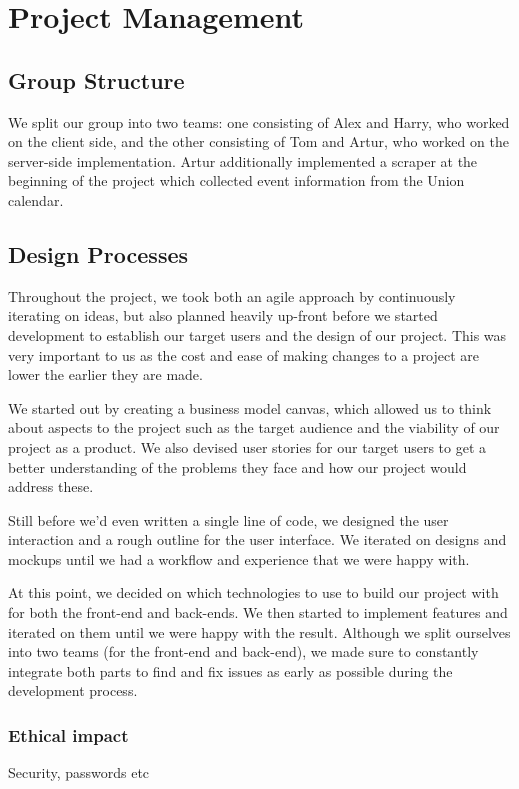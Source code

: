 \documentclass[11pt]{article}
\begin{document}
\section {Project Management}

\subsection {Group Structure}

We split our group into two teams: one consisting of Alex and Harry, who worked on the client side, and the other consisting of Tom and Artur, who worked on the server-side implementation. Artur additionally implemented a scraper at the beginning of the project which collected event information from the Union calendar.

\subsection {Design Processes}

Throughout the project, we took both an agile approach by continuously iterating on ideas, but also planned heavily up-front before we started development to establish our target users and the design of our project. This was very important to us as the cost and ease of making changes to a project are lower the earlier they are made.

We started out by creating a business model canvas, which allowed us to think about aspects to the project such as the target audience and the viability of our project as a product. We also devised user stories for our target users to get a better understanding of the problems they face and how our project would address these.

Still before we'd even written a single line of code, we designed the user interaction and a rough outline for the user interface. We iterated on designs and mockups until we had a workflow and experience that we were happy with.

At this point, we decided on which technologies to use to build our project with for both the front-end and back-ends. We then started to implement features and iterated on them until we were happy with the result. Although we split ourselves into two teams (for the front-end and back-end), we made sure to constantly integrate both parts to find and fix issues as early as possible during the development process.

\subsubsection {Ethical impact}
Security, passwords etc
\end{document}
